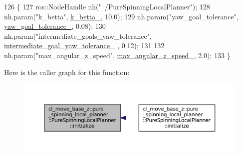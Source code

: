 \begin{DoxyCode}
126 \{
127   ros::NodeHandle nh(\textcolor{stringliteral}{"~/PureSpinningLocalPlanner"});
128   nh.param(\textcolor{stringliteral}{"k\_betta"}, \hyperlink{classcl__move__base__z_1_1pure__spinning__local__planner_1_1PureSpinningLocalPlanner_a379d2ba057231d76edd1a661d3572d68}{k\_betta\_}, 10.0);
129   nh.param(\textcolor{stringliteral}{"yaw\_goal\_tolerance"}, \hyperlink{classcl__move__base__z_1_1pure__spinning__local__planner_1_1PureSpinningLocalPlanner_a07334cd7bf29f391c2553f0038fa94e8}{yaw\_goal\_tolerance\_}, 0.08);
130   nh.param(\textcolor{stringliteral}{"intermediate\_goals\_yaw\_tolerance"}, \hyperlink{classcl__move__base__z_1_1pure__spinning__local__planner_1_1PureSpinningLocalPlanner_a2e8dfda5e9dea6f09db4056aa90b2aa8}{intermediate\_goal\_yaw\_tolerance\_}
      , 0.12);
131   
132   nh.param(\textcolor{stringliteral}{"max\_angular\_z\_speed"}, \hyperlink{classcl__move__base__z_1_1pure__spinning__local__planner_1_1PureSpinningLocalPlanner_a20edb2db356925684de4ee4fe03d5992}{max\_angular\_z\_speed\_}, 2.0);
133 \}
\end{DoxyCode}
Here is the caller graph for this function\+:
\nopagebreak
\begin{figure}[H]
\begin{center}
\leavevmode
\includegraphics[width=350pt]{classcl__move__base__z_1_1pure__spinning__local__planner_1_1PureSpinningLocalPlanner_a12fc5253f53f66e3e9735a72ebc9343f_icgraph}
\end{center}
\end{figure}
\mbox{\label{classcl__move__base__z_1_1pure__spinning__local__planner_1_1PureSpinningLocalPlanner_ae97111281935628a23cfca3c65f5d8c7}} 
